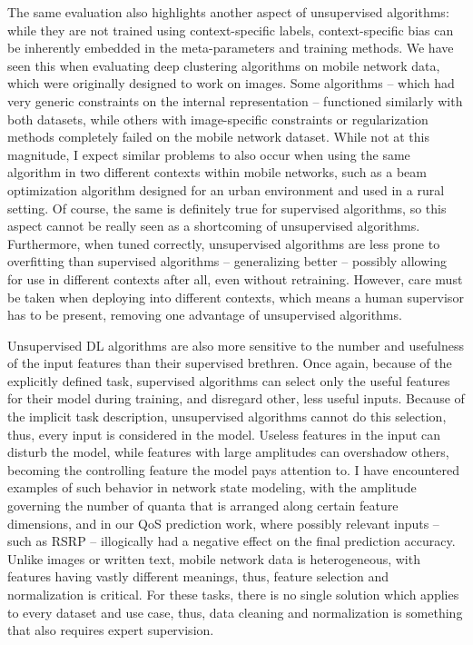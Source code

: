 			The same evaluation also highlights another aspect of unsupervised algorithms: while they are not trained using context-specific labels, context-specific bias can be inherently embedded in the meta-parameters and training methods.
			We have seen this when evaluating deep clustering algorithms on mobile network data, which were originally designed to work on images.
			Some algorithms -- which had very generic constraints on the internal representation -- functioned similarly with both datasets, while others with image-specific constraints or regularization methods completely failed on the mobile network dataset.
			While not at this magnitude, I expect similar problems to also occur when using the same algorithm in two different contexts within mobile networks, such as a beam optimization algorithm designed for an urban environment and used in a rural setting.
			Of course, the same is definitely true for supervised algorithms, so this aspect cannot be really seen as a shortcoming of unsupervised algorithms.
			Furthermore, when tuned correctly, unsupervised algorithms are less prone to overfitting than supervised algorithms -- generalizing better -- possibly allowing for use in different contexts after all, even without retraining.
			However, care must be taken when deploying into different contexts, which means a human supervisor has to be present, removing one advantage of unsupervised algorithms.
			
			Unsupervised \ac{DL} algorithms are also more sensitive to the number and usefulness of the input features than their supervised brethren.
			Once again, because of the explicitly defined task, supervised algorithms can select only the useful features for their model during training, and disregard other, less useful inputs.
			Because of the implicit task description, unsupervised algorithms cannot do this selection, thus, every input is considered in the model.
			Useless features in the input can disturb the model, while features with large amplitudes can overshadow others, becoming the controlling feature the model pays attention to.
			I have encountered examples of such behavior in network state modeling, with the amplitude governing the number of quanta that is arranged along certain feature dimensions, and in our \ac{QoS} prediction work, where possibly relevant inputs -- such as \ac{RSRP} -- illogically had a negative effect on the final prediction accuracy.
			Unlike images or written text, mobile network data is heterogeneous, with features having vastly different meanings, thus, feature selection and normalization is critical.
			For these tasks, there is no single solution which applies to every dataset and use case, thus, data cleaning and normalization is something that also requires expert supervision.
			
